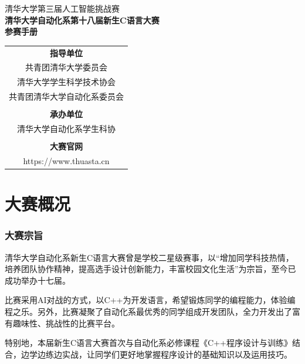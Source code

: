 \documentclass[a4paper,4pt]{article}
\begin{document}
\begin{titlepage}
  \heiti
  \vspace*{20pt}
  \begin{center}
    \fontsize{20pt}{0} {清华大学第三届人工智能挑战赛}\\
    \vspace*{20pt}
    \fontsize{20pt}{0} \textbf{清华大学自动化系第十八届新生C语言大赛}\\
    \vspace*{20pt}
    \fontsize{20pt}{0} \textbf{参赛手册}\\
    \vspace*{280pt}
    \normalsize
    \rmfamily
    \begin{tabular}{c} %
      \textbf{指导单位}            \\
      共青团清华大学委员会         \\
      清华大学学生科学技术协会     \\
      共青团清华大学自动化系委员会 \\
      \\
      \textbf{承办单位}            \\
      清华大学自动化系学生科协     \\
      \\
      \textbf{大赛官网}            \\
      https://www.thuasta.cn\\
    \end{tabular}
  \end{center}
\end{titlepage}


\tableofcontents%
\newpage%
\part{大赛概况}
\section{大赛宗旨}
清华大学自动化系新生C语言大赛曾是学校二星级赛事，以“增加同学科技热情，培养团队协作精神，提高选手设计创新能力，丰富校园文化生活”为宗旨，至今已成功举办十七届。\par
比赛采用AI对战的方式，以C++为开发语言，希望锻炼同学的编程能力，体验编程之乐。另外，比赛凝聚了自动化系最优秀的同学组成开发团队，全力开发出了富有趣味性、挑战性的比赛平台。\par
特别地，本届新生C语言大赛首次与自动化系必修课程《C++程序设计与训练》结合，边学边练边实战，让同学们更好地掌握程序设计的基础知识以及运用技巧。
\end{document}
